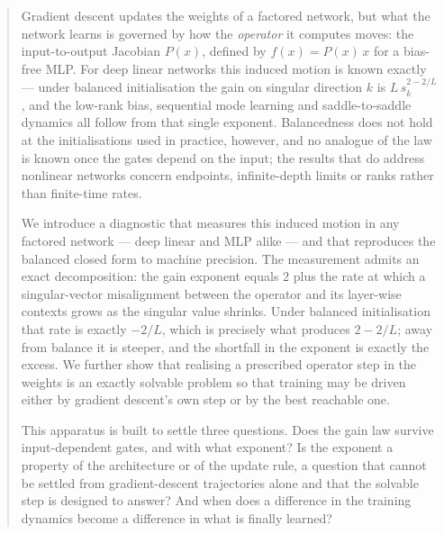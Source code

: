 \begin{abstract}
Gradient descent updates the weights of a factored network, but what the network learns is governed by how the \emph{operator} it computes moves: the input-to-output Jacobian $P(x)$, defined by $f(x) = P(x)\,x$ for a bias-free MLP. For deep linear networks this induced motion is known exactly --- under balanced initialisation the gain on singular direction $k$ is $L\,s_k^{2-2/L}$, and the low-rank bias, sequential mode learning and saddle-to-saddle dynamics all follow from that single exponent. Balancedness does not hold at the initialisations used in practice, however, and no analogue of the law is known once the gates depend on the input; the results that do address nonlinear networks concern endpoints, infinite-depth limits or ranks rather than finite-time rates.

We introduce a diagnostic that measures this induced motion in any factored network --- deep linear and MLP alike --- and that reproduces the balanced closed form to machine precision. The measurement admits an exact decomposition: the gain exponent equals $2$ plus the rate at which a singular-vector misalignment between the operator and its layer-wise contexts grows as the singular value shrinks. Under balanced initialisation that rate is exactly $-2/L$, which is precisely what produces $2-2/L$; away from balance it is steeper, and the shortfall in the exponent is exactly the excess. We further show that realising a prescribed operator step in
the weights is an exactly solvable problem so that training may be driven either by gradient descent's own step or by the best reachable one.

This apparatus is built to settle three questions. Does the gain law survive input-dependent gates, and with what exponent? Is the exponent a property of the architecture or of the update rule, a question that cannot be settled from gradient-descent trajectories alone and that the solvable step is designed to answer? And when does a difference in the training dynamics become a difference in what is finally learned?
\end{abstract}
